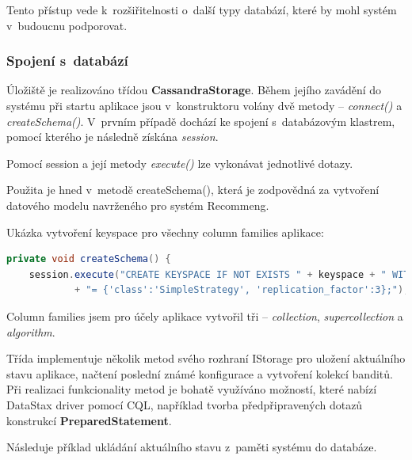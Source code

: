 \documentclass[thesis=M,czech]{FITthesis}[2014/05/07]
\begin{document}
Tento přístup vede k~rozšiřitelnosti o~další typy databází, které by mohl systém v~budoucnu podporovat. 

\subsubsection{Spojení s~databází}
Úložiště je realizováno třídou \textbf{CassandraStorage}. Během jejího zavádění do systému při startu aplikace jsou v~konstruktoru volány dvě metody – \emph{connect()} a \emph{createSchema()}. V~prvním případě dochází ke spojení s~databázovým klastrem, pomocí kterého je následně získána \emph{session}.

Pomocí session a její metody \emph{execute()} lze vykonávat jednotlivé dotazy. 

Použita je hned v~metodě createSchema(), která je zodpovědná za vytvoření datového modelu navrženého pro systém Recommeng.

Ukázka vytvoření keyspace pro všechny column families aplikace:

\begin{lstlisting}[language=java]
private void createSchema() {        
    session.execute("CREATE KEYSPACE IF NOT EXISTS " + keyspace + " WITH replication "
            + "= {'class':'SimpleStrategy', 'replication_factor':3};");
\end{lstlisting}

Column families jsem pro účely aplikace vytvořil tři – \emph{collection}, \emph{supercollection} a \emph{algorithm}.

Třída implementuje několik metod svého rozhraní IStorage pro uložení aktuálního stavu aplikace, načtení poslední známé konfigurace a vytvoření kolekcí banditů. Při realizaci funkcionality metod je bohatě využíváno možností, které nabízí DataStax driver pomocí CQL, například tvorba předpřipravených dotazů konstrukcí \textbf{PreparedStatement}. 

Následuje příklad ukládání aktuálního stavu z~paměti systému do databáze.
\end{document}
